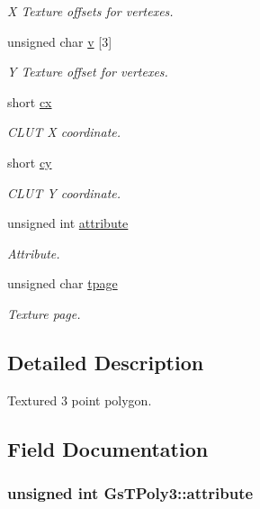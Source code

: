 \begin{DoxyCompactItemize}
\begin{DoxyCompactList}\small\item\em X Texture offsets for vertexes. \end{DoxyCompactList}\item 
unsigned char \hyperlink{structGsTPoly3_a0542f91621ad1a3ad58c57529edbc9ae}{v} \mbox{[}3\mbox{]}
\begin{DoxyCompactList}\small\item\em Y Texture offset for vertexes. \end{DoxyCompactList}\item 
short \hyperlink{structGsTPoly3_a43b86f46391cd471dc92a9dec1a3b46f}{cx}
\begin{DoxyCompactList}\small\item\em C\+L\+U\+T X coordinate. \end{DoxyCompactList}\item 
short \hyperlink{structGsTPoly3_a825c6c03d56ff019f7845f06222d096a}{cy}
\begin{DoxyCompactList}\small\item\em C\+L\+U\+T Y coordinate. \end{DoxyCompactList}\item 
unsigned int \hyperlink{structGsTPoly3_a4f85d7de528311b6354979fdcef9b25e}{attribute}
\begin{DoxyCompactList}\small\item\em Attribute. \end{DoxyCompactList}\item 
unsigned char \hyperlink{structGsTPoly3_a12e862df67b142de177d776c29272e67}{tpage}
\begin{DoxyCompactList}\small\item\em Texture page. \end{DoxyCompactList}\end{DoxyCompactItemize}


\subsection{Detailed Description}
Textured 3 point polygon. 

\subsection{Field Documentation}
\hypertarget{structGsTPoly3_a4f85d7de528311b6354979fdcef9b25e}{}
\subsubsection[{attribute}]{\setlength{\rightskip}{0pt plus 5cm}unsigned int Gs\+T\+Poly3\+::attribute}\label{structGsTPoly3_a4f85d7de528311b6354979fdcef9b25e}


